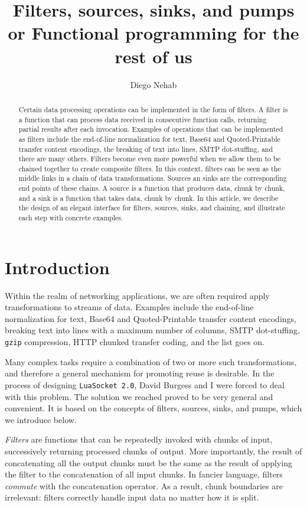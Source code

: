 \documentclass[10pt]{article}
\title{Filters, sources, sinks, and pumps\\
      {\large or Functional programming for the rest of us}}
\author{Diego Nehab}
\begin{document}
\maketitle

\begin{abstract}
Certain data processing operations can be implemented in the 
form of filters. A filter is a function that can process data 
received in consecutive function calls, returning partial
results after each invocation.  Examples of operations that can be
implemented as filters include the end-of-line normalization
for text, Base64 and Quoted-Printable transfer content
encodings, the breaking of text into lines, SMTP dot-stuffing, 
and there are many others.  Filters become even
more powerful when we allow them to be chained together to
create composite filters. In this context, filters can be seen 
as the middle links in a chain of data transformations. Sources an sinks
are the corresponding end points of these chains. A source
is a function that produces data, chunk by chunk, and a sink
is a function that takes data, chunk by chunk. In this
article, we describe the design of an elegant interface for filters,
sources, sinks, and chaining, and illustrate each step 
with concrete examples. 
\end{abstract}


\section{Introduction}

Within the realm of networking applications, we are often
required apply transformations to streams of data. Examples
include the end-of-line normalization for text, Base64 and
Quoted-Printable transfer content encodings, breaking text
into lines with a maximum number of columns, SMTP
dot-stuffing, \texttt{gzip} compression, HTTP chunked
transfer coding, and the list goes on.

Many complex tasks require a combination of two or more such
transformations, and therefore a general mechanism for
promoting reuse is desirable. In the process of designing
\texttt{LuaSocket~2.0}, David Burgess and I were forced to deal with
this problem. The solution we reached proved to be very
general and convenient. It is based on the concepts of
filters, sources, sinks, and pumps, which we introduce
below. 

\emph{Filters} are functions that can be repeatedly invoked
with chunks of input, successively returning processed
chunks of output. More importantly, the result of
concatenating all the output chunks must be the same as the
result of applying the filter to the concatenation of all
input chunks. In fancier language, filters \emph{commute}
with the concatenation operator. As a result, chunk
boundaries are irrelevant: filters correctly handle input
data no matter how it is split. 
\end{document}
